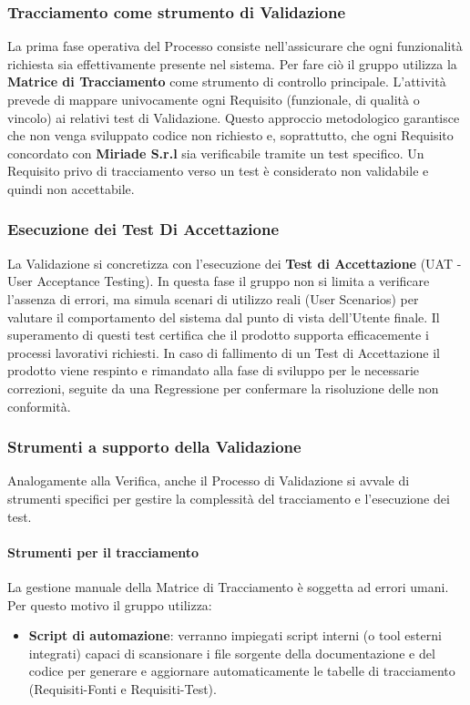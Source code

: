 \documentclass[a4paper,12pt]{article}
\begin{document}
\subsubsection{Tracciamento come strumento di Validazione}
La prima fase operativa del Processo consiste nell'assicurare che ogni funzionalità richiesta sia effettivamente presente nel sistema. Per fare ciò il gruppo utilizza la \textbf{Matrice di Tracciamento} come strumento di controllo principale.
L'attività prevede di mappare univocamente ogni Requisito (funzionale, di qualità o vincolo) ai relativi test di Validazione.
Questo approccio metodologico garantisce che non venga sviluppato codice non richiesto e, soprattutto, che ogni Requisito concordato con \textbf{Miriade S.r.l} sia verificabile tramite un test specifico. Un Requisito privo di tracciamento verso un test è considerato non validabile e quindi non accettabile.

\subsubsection{Esecuzione dei Test Di Accettazione}
La Validazione si concretizza con l'esecuzione dei \textbf{Test di Accettazione} (UAT - User Acceptance Testing).
In questa fase il gruppo non si limita a verificare l'assenza di errori, ma simula scenari di utilizzo reali (User Scenarios) per valutare il comportamento del sistema dal punto di vista dell'Utente finale.
Il superamento di questi test certifica che il prodotto supporta efficacemente i processi lavorativi richiesti. In caso di fallimento di un Test di Accettazione il prodotto viene respinto e rimandato alla fase di sviluppo per le necessarie correzioni, seguite da una Regressione per confermare la risoluzione delle non conformità.

\subsubsection{Strumenti a supporto della Validazione}
Analogamente alla Verifica, anche il Processo di Validazione si avvale di strumenti specifici per gestire la complessità del tracciamento e l'esecuzione dei test.

\paragraph{Strumenti per il tracciamento}
La gestione manuale della Matrice di Tracciamento è soggetta ad errori umani. Per questo motivo il gruppo utilizza:
\begin{itemize}
    \item \textbf{Script di automazione}: verranno impiegati script interni (o tool esterni integrati) capaci di scansionare i file sorgente della documentazione e del codice per generare e aggiornare automaticamente le tabelle di tracciamento (Requisiti-Fonti e Requisiti-Test).
\end{itemize}
\end{document}
